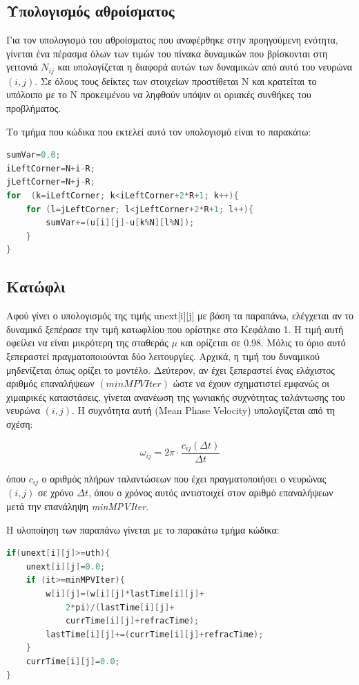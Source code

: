 \documentclass[12pt,a4paper]{article}
\begin{document}
\subsection{Υπολογισμός αθροίσματος}

Για τον υπολογισμό του αθροίσματος που αναφέρθηκε στην προηγούμενη ενότητα, γίνεται ένα πέρασμα όλων των τιμών του πίνακα δυναμικών που βρίσκονται στη γειτονιά $N_{ij}$ και υπολογίζεται η διαφορά αυτών των δυναμικών από αυτό του νευρώνα $(i,j)$. Σε όλους τους δείκτες των στοιχείων προστίθεται N και κρατείται το υπόλοιπο με το N προκειμένου να ληφθούν υπόψιν οι οριακές συνθήκες του προβλήματος.

Το τμήμα που κώδικα που εκτελεί αυτό τον υπολογισμό είναι το παρακάτω:
\begin{lstlisting}[language=C,frame=single]
sumVar=0.0;
iLeftCorner=N+i-R;
jLeftCorner=N+j-R;
for  (k=iLeftCorner; k<iLeftCorner+2*R+1; k++){
	for (l=jLeftCorner; l<jLeftCorner+2*R+1; l++){
		sumVar+=(u[i][j]-u[k%N][l%N]);
	}
}
\end{lstlisting}

\subsection{Κατώφλι}
Aφού γίνει ο υπολογισμός της τιμής unext[i][j] με βάση τα παραπάνω, ελέγχεται αν το δυναμικό ξεπέρασε την τιμή κατωφλίου που ορίστηκε στο Κεφάλαιο 1. Η τιμή αυτή οφείλει να είναι μικρότερη της σταθεράς $\mu$ και ορίζεται σε 0.98. Μόλις το όριο αυτό ξεπεραστεί πραγματοποιούνται δύο λειτουργίες. Αρχικά, η τιμή του δυναμικού μηδενίζεται όπως ορίζει το μοντέλο. Δεύτερον, αν έχει ξεπεραστεί ένας ελάχιστος αριθμός επαναλήψεων $(minMPVIter)$ ώστε να έχουν σχηματιστεί εμφανώς οι χιμαιρικές καταστάσεις, γίνεται ανανέωση της γωνιακής συχνότητας ταλάντωσης του νευρώνα $(i,j)$. Η συχνότητα αυτή (Mean Phase Velocity) υπολογίζεται από τη σχέση:

\begin{equation}
\omega_{ij}=2\pi \cdot \frac{c_{ij}(\Delta t)}{\Delta t}
\end{equation}

\noindent όπου $c_{ij}$ ο αριθμός πλήρων ταλαντώσεων που έχει πραγματοποιήσει ο νευρώνας $(i,j)$ σε χρόνο $\Delta t$, όπου ο χρόνος αυτός αντιστοιχεί στον αριθμό επαναλήψεων μετά την επανάληψη \textit{minMPVIter}.

Η υλοποίηση των παραπάνω γίνεται με το παρακάτω τμήμα κώδικα: 
\newpage
\begin{lstlisting}[language=C,frame=single]
if(unext[i][j]>=uth){
	unext[i][j]=0.0;
	if (it>=minMPVIter){
		w[i][j]=(w[i][j]*lastTime[i][j]+
			2*pi)/(lastTime[i][j]+
			currTime[i][j]+refracTime);
		lastTime[i][j]+=(currTime[i][j]+refracTime);
	}
	currTime[i][j]=0.0;
}
\end{lstlisting}
\end{document}
